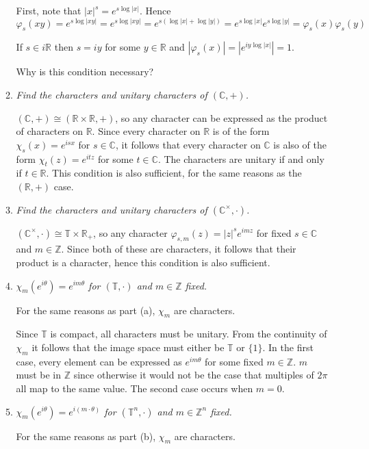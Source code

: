 \documentclass[letterpaper,11pt]{article}
\newcommand{\C}{\mathbb{C}}
\newcommand{\R}{\mathbb{R}}
\newcommand{\T}{\mathbb{T}}
\newcommand{\Z}{\mathbb{Z}}
\begin{document}
\begin{enumerate}
\begin{enumerate}
First, note that $|x|^s = e^{s \log |x|}$.  Hence
\[
\varphi_s\left(xy\right) = e^{s \log |xy|} = e^{s \log |xy|} = e^{s\left(\log|x| + \log|y|\right)} = e^{s \log|x|}e^{s \log|y|} = \varphi_s\left(x\right)\varphi_s\left(y\right)
\]

If $s \in i\R$ then $s = iy$ for some $y \in \R$ and $|\varphi_s\left(x\right)| = \left|e^{iy\log|x|}\right| = 1$.

Why is this condition necessary?

\item \emph{Find the characters and unitary characters of $(\C,+)$.}

$(\C,+) \cong (\R \times \R, +)$, so any character can be expressed as the product of characters on $\R$.  Since every character on $\R$ is of the form $\chi_s\left(x\right) = e^{isx}$ for $s \in \C$, it follows that every character on $\C$ is also of the form $\chi_t\left(z\right) = e^{itz}$ for some $t \in \C$.  The characters are unitary if and only if $t \in \R$.  This condition is also sufficient, for the same reasons as the $(\R,+)$ case.

\item \emph{Find the characters and unitary characters of $(\C^\times,\cdot)$.}

$(\C^\times, \cdot) \cong \T \times \R_+$, so any character $\varphi_{s,m}(z) = |z|^se^{imz}$ for fixed $s \in \C$ and $m \in \Z$.  Since both of these are characters, it follows that their product is a character, hence this condition is also sufficient.

\item \emph{$\chi_m(e^{i\theta}) = e^{im\theta}$ for $(\T, \cdot)$ and $m \in \Z$ fixed.}

For the same reasons as part (a), $\chi_m$ are characters.  

Since $\T$ is compact, all characters must be unitary.  From the continuity of $\chi_m$ it follows that the image space must either be $\T$ or $\{1\}$.  In the first case, every element can be expressed as $e^{im\theta}$ for some fixed $m \in \Z$.  $m$ must be in $\Z$ since otherwise it would not be the case that multiples of $2\pi$ all map to the same value.  The second case occurs when $m=0$.

\newpage

\item \emph{$\chi_m(e^{i\theta}) = e^{i(m \cdot \theta)}$ for $(\T^n, \cdot)$ and $m \in \Z^n$ fixed.}

For the same reasons as part (b), $\chi_m$ are characters.


\end{enumerate}
\end{enumerate}
\end{document}
